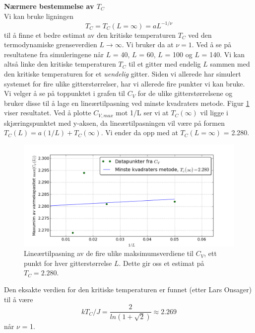 \documentclass[11pt,a4paper]{article}
\begin{document}
\textbf{Nærmere bestemmelse av $T_C$}\\
Vi kan bruke ligningen 
\[T_C = T_C(L=\infty) = aL^{-1/\nu} \]
til å finne et bedre estimat av den kritiske temperaturen $T_C$ ved den termodynamiske grenseverdien $L \rightarrow \infty$. Vi bruker da at $\nu = 1$. Ved å se på resultatene fra simuleringene når $L$ = 40, $L$ = 60, $L$ = 100 og $L$ = 140. Vi kan altså linke den kritiske temperaturen $T_C$ til et gitter med endelig $L$ sammen med den kritiske temperaturen for et \textit{uendelig} gitter. Siden vi allerede har simulert systemet for fire ulike gitterstørrelser, har vi allerede fire punkter vi kan bruke. Vi velger å se på toppunktet i grafen til $C_V$ for de ulike gitterstørrelsene og bruker disse til å lage en lineærtilpasning ved minste kvadraters metode. Figur \ref{TC} viser resultatet. Ved å plotte $C_{V, max}$ mot 1/L ser vi at $T_C(\infty)$ vil ligge i skjæringspunktet med y-aksen, da lineærtilpasningen vil være på formen $T_C(L) = a(1/L) + T_C(\infty)$. Vi ender da opp med at $T_C(L=\infty)$ = 2.280. 

\FloatBarrier
\begin{figure}[!ht]
 \centering
 \includegraphics[scale=0.5]{4fTC.png}
 \caption{Lineærtilpasning av de fire ulike maksimumsverdiene til $C_V$, ett punkt for hver gitterstørrelse $L$. Dette gir oss et estimat på $T_C = 2.280$. }
 \label{TC}
 \end{figure}
 \FloatBarrier

Den eksakte verdien for den kritiske temperaturen er funnet (etter Lars Onsager) til å være 
\[kT_C/J = \frac{2}{ln(1 + \sqrt{2})} \approx 2.269 \] 
når $\nu$ = 1.
\end{document}
